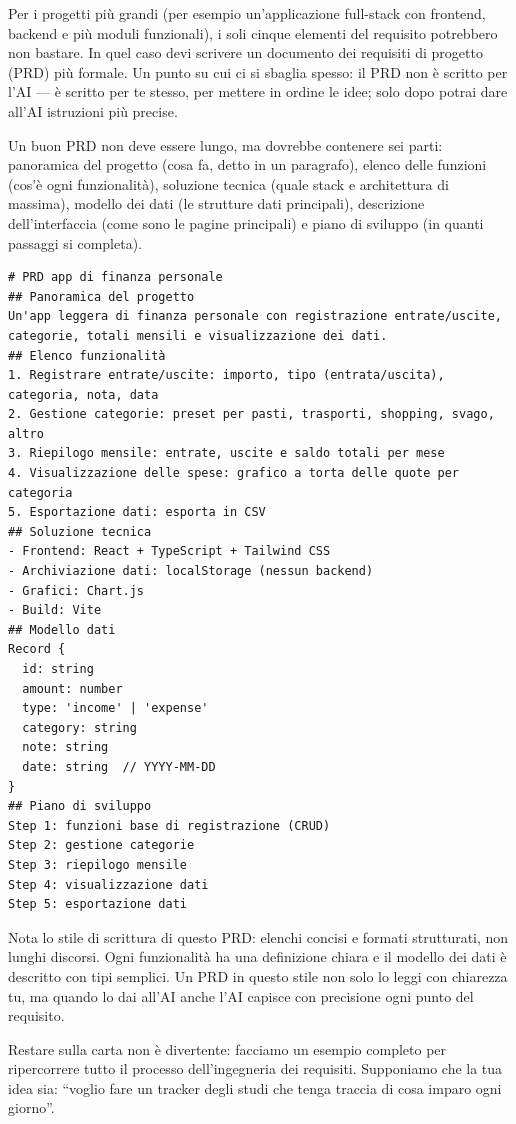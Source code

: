 Per i progetti più grandi (per esempio un'applicazione full-stack con frontend, backend e più moduli funzionali), i soli cinque elementi del requisito potrebbero non bastare. In quel caso devi scrivere un documento dei requisiti di progetto (PRD) più formale. Un punto su cui ci si sbaglia spesso: il PRD non è scritto per l'AI — è scritto per te stesso, per mettere in ordine le idee; solo dopo potrai dare all'AI istruzioni più precise.

Un buon PRD non deve essere lungo, ma dovrebbe contenere sei parti: panoramica del progetto (cosa fa, detto in un paragrafo), elenco delle funzioni (cos'è ogni funzionalità), soluzione tecnica (quale stack e architettura di massima), modello dei dati (le strutture dati principali), descrizione dell'interfaccia (come sono le pagine principali) e piano di sviluppo (in quanti passaggi si completa).

\begin{lstlisting}
# PRD app di finanza personale
## Panoramica del progetto
Un'app leggera di finanza personale con registrazione entrate/uscite, categorie, totali mensili e visualizzazione dei dati.
## Elenco funzionalità
1. Registrare entrate/uscite: importo, tipo (entrata/uscita), categoria, nota, data
2. Gestione categorie: preset per pasti, trasporti, shopping, svago, altro
3. Riepilogo mensile: entrate, uscite e saldo totali per mese
4. Visualizzazione delle spese: grafico a torta delle quote per categoria
5. Esportazione dati: esporta in CSV
## Soluzione tecnica
- Frontend: React + TypeScript + Tailwind CSS
- Archiviazione dati: localStorage (nessun backend)
- Grafici: Chart.js
- Build: Vite
## Modello dati
Record {
  id: string
  amount: number
  type: 'income' | 'expense'
  category: string
  note: string
  date: string  // YYYY-MM-DD
}
## Piano di sviluppo
Step 1: funzioni base di registrazione (CRUD)
Step 2: gestione categorie
Step 3: riepilogo mensile
Step 4: visualizzazione dati
Step 5: esportazione dati
\end{lstlisting}

Nota lo stile di scrittura di questo PRD: elenchi concisi e formati strutturati, non lunghi discorsi. Ogni funzionalità ha una definizione chiara e il modello dei dati è descritto con tipi semplici. Un PRD in questo stile non solo lo leggi con chiarezza tu, ma quando lo dai all'AI anche l'AI capisce con precisione ogni punto del requisito.


Restare sulla carta non è divertente: facciamo un esempio completo per ripercorrere tutto il processo dell'ingegneria dei requisiti. Supponiamo che la tua idea sia: “voglio fare un tracker degli studi che tenga traccia di cosa imparo ogni giorno”.

